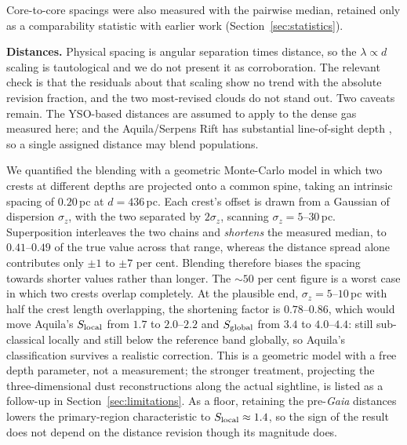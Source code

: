 \documentclass[usenatbib,twoside,twocolumn]{mnras}
\begin{document}
Core-to-core spacings were also measured with the pairwise median, retained only as a comparability statistic with earlier work (Section~\ref{sec:statistics}).

\smallskip\noindent\textbf{Distances.} Physical spacing is angular separation times distance, so the $\lambda\propto d$ scaling is tautological and we do not present it as corroboration. The relevant check is that the residuals about that scaling show no trend with the absolute revision fraction, and the two most-revised clouds do not stand out. Two caveats remain. The YSO-based distances \citep{Zhang2023} are assumed to apply to the dense gas measured here; and the Aquila/Serpens Rift has substantial line-of-sight depth \citep{Zucker2020,Green2024}, so a single assigned distance may blend populations.

We quantified the blending with a geometric Monte-Carlo model in which two crests at different depths are projected onto a common spine, taking an intrinsic spacing of $0.20$\,pc at $d=436$\,pc. Each crest's offset is drawn from a Gaussian of dispersion $\sigma_z$, with the two separated by $2\sigma_z$, scanning $\sigma_z=5$--$30$\,pc. Superposition interleaves the two chains and \emph{shortens} the measured median, to $0.41$--$0.49$ of the true value across that range, whereas the distance spread alone contributes only $\pm1$ to $\pm7$ per cent. Blending therefore biases the spacing towards shorter values rather than longer. The $\sim50$ per cent figure is a worst case in which two crests overlap completely. At the plausible end, $\sigma_z=5$--$10$\,pc with half the crest length overlapping, the shortening factor is $0.78$--$0.86$, which would move Aquila's $S_{\rm local}$ from $1.7$ to $2.0$--$2.2$ and $S_{\rm global}$ from $3.4$ to $4.0$--$4.4$: still sub-classical locally and still below the reference band globally, so Aquila's classification survives a realistic correction. This is a geometric model with a free depth parameter, not a measurement; the stronger treatment, projecting the three-dimensional dust reconstructions along the actual sightline, is listed as a follow-up in Section~\ref{sec:limitations}. As a floor, retaining the pre-\textit{Gaia} distances lowers the primary-region characteristic to $S_{\rm local}\approx1.4$, so the sign of the result does not depend on the distance revision though its magnitude does.
\end{document}
